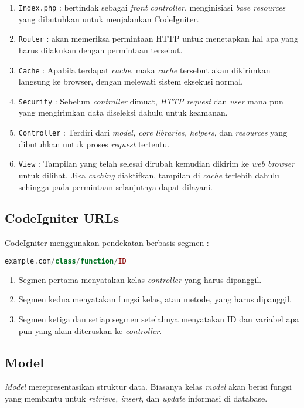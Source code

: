 \begin{enumerate}
	\item \texttt{Index.php} : bertindak sebagai \textit{front controller}, menginisiasi \textit{base resources} yang dibutuhkan untuk menjalankan CodeIgniter.
	\item \texttt{Router} : akan memeriksa permintaan HTTP untuk menetapkan hal apa yang harus dilakukan dengan permintaan tersebut.
	\item \texttt{Cache} : Apabila terdapat \textit{cache}, maka \textit{cache} tersebut akan dikirimkan langsung ke browser, dengan melewati sistem eksekusi normal.
	\item \texttt{Security} : Sebelum \textit{controller} dimuat, \textit{HTTP request} dan \textit{user} mana pun yang mengirimkan data diseleksi dahulu untuk keamanan.
	\item \texttt{Controller} : Terdiri dari \textit{model, core libraries, helpers}, dan \textit{resources} yang dibutuhkan untuk proses \textit{request} tertentu.
	\item \texttt{View} : Tampilan yang telah selesai dirubah kemudian dikirim ke \textit{web browser} untuk dilihat. Jika \textit{caching} diaktifkan, tampilan di \textit{cache} terlebih dahulu sehingga pada permintaan selanjutnya dapat dilayani.\cite{codeigniter}
\end{enumerate}

\subsection{CodeIgniter URLs}
CodeIgniter menggunakan pendekatan berbasis segmen :
\begin{lstlisting}[frame=single, language=PHP, label={lst:urlCI}, caption=Kode URLs pada CodeIgniter] 
example.com/class/function/ID
\end{lstlisting}

\begin{enumerate}
	\item Segmen pertama menyatakan kelas \textit{controller} yang harus dipanggil.
	\item Segmen kedua menyatakan fungsi kelas, atau metode, yang harus dipanggil.
	\item Segmen ketiga dan setiap segmen setelahnya menyatakan ID dan variabel apa pun yang akan diteruskan ke \textit{controller}.
\end{enumerate}

\subsection{Model}
\textit{Model} merepresentasikan struktur data. Biasanya kelas \textit {model} akan berisi fungsi yang membantu untuk \textit{retrieve, insert}, dan \textit{update} informasi di database.

